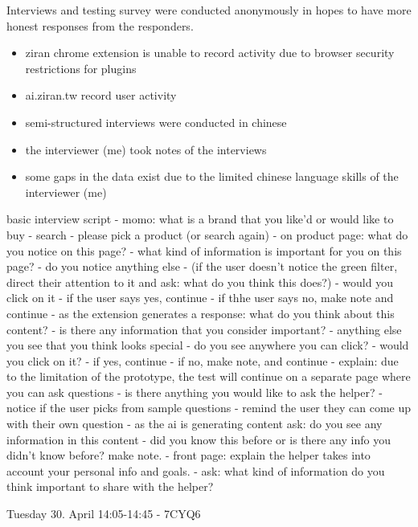 \documentclass[
  letterpaper,
  DIV=11,
  numbers=noendperiod]{scrartcl}
\providecommand{\tightlist}{%
  \setlength{\itemsep}{0pt}\setlength{\parskip}{0pt}}\usepackage{longtable,booktabs,array}
\begin{document}
Interviews and testing survey were conducted anonymously in hopes to
have more honest responses from the responders.

\begin{itemize}
\tightlist
\item
  ziran chrome extension is unable to record activity due to browser
  security restrictions for plugins
\item
  ai.ziran.tw record user activity
\item
  semi-structured interviews were conducted in chinese
\item
  the interviewer (me) took notes of the interviews
\item
  some gaps in the data exist due to the limited chinese language skills
  of the interviewer (me)
\end{itemize}

basic interview script - momo: what is a brand that you like'd or would
like to buy - search - please pick a product (or search again) - on
product page: what do you notice on this page? - what kind of
information is important for you on this page? - do you notice anything
else - (if the user doesn't notice the green filter, direct their
attention to it and ask: what do you think this does?) - would you click
on it - if the user says yes, continue - if thhe user says no, make note
and continue - as the extension generates a response: what do you think
about this content? - is there any information that you consider
important? - anything else you see that you think looks special - do you
see anywhere you can click? - would you click on it? - if yes, continue
- if no, make note, and continue - explain: due to the limitation of the
prototype, the test will continue on a separate page where you can ask
questions - is there anything you would like to ask the helper? - notice
if the user picks from sample questions - remind the user they can come
up with their own question - as the ai is generating content ask: do you
see any information in this content - did you know this before or is
there any info you didn't know before? make note. - front page: explain
the helper takes into account your personal info and goals. - ask: what
kind of information do you think important to share with the helper?

Tuesday 30. April 14:05-14:45 - 7CYQ6
\end{document}
